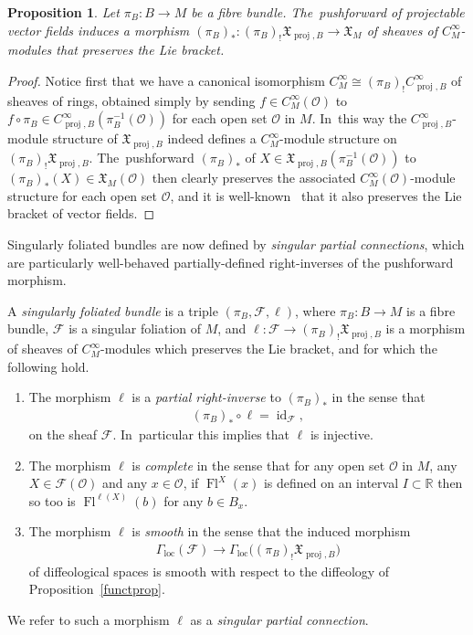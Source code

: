 \documentclass[11pt]{article}
\numberwithin{equation}{section}
\numberwithin{equation}{section}
\newtheorem{Proposition}[Theorem]{Proposition}
\def\loc{\operatorname{loc}}
\def\id{\operatorname{id}}
\def\proj{\operatorname{proj}}
\def\Fl{\operatorname{Fl}}
\def\FF{{\mathcal{F}}}
\def\OO{{\mathcal{O}}}
\def\RB{{\mathbb{R}}}
\def\XF{{\mathfrak{X}}}
\begin{document}
\begin{Proposition}
Let $\pi_{B}\colon B\rightarrow M$ be a fibre bundle. The~pushforward of projectable vector fields induces a morphism $(\pi_{B})_{*}\colon (\pi_{B})_{!}\XF_{\proj,B}\rightarrow\XF_{M}$ of sheaves of $C^{\infty}_{M}$-modules that preserves the Lie bracket.
\end{Proposition}

\begin{proof}
Notice first that we have a canonical isomorphism $C^{\infty}_{M}\cong (\pi_{B})_{!}C^{\infty}_{\proj,B}$ of sheaves of rings, obtained simply by sending $f\in C^{\infty}_{M}(\OO)$ to $f\circ\pi_{B}\in C^{\infty}_{\proj,B}(\pi_{B}^{-1}(\OO))$ for each open set $\OO$ in $M$. In~this way the $C^{\infty}_{\proj,B}$-module structure of $\XF_{\proj,B}$ indeed defines a $C^{\infty}_{M}$-module structure on $(\pi_{B})_{!}\XF_{\proj,B}$. The~pushforward $(\pi_{B})_{*}$ of $X\in\XF_{\proj,B}(\pi_{B}^{-1}(\OO))$ to $(\pi_{B})_{*}(X)\in\XF_{M}(\OO)$ then clearly preserves the associated $C^{\infty}_{M}(\OO)$-module structure for each open set $\OO$, and it is well-known~\cite[Lemma~3.10]{natopdiffgeom} that it also preserves the Lie bracket of vector fields.
\end{proof}

Singularly foliated bundles are now defined by \textit{singular partial connections}, which are particularly well-behaved partially-defined right-inverses of the pushforward morphism.

\begin{Definition}\label{singfolbund}
A \textit{singularly foliated bundle} is a triple $(\pi_{B},\FF,\ell)$, where $\pi_{B}\colon B\rightarrow M$ is a fibre bundle, $\FF$ is a singular foliation of $M$, and $\ell\colon \FF\rightarrow(\pi_{B})_{!}\XF_{\proj,B}$ is a morphism of sheaves of $C^{\infty}_{M}$-modules which preserves the Lie bracket, and for which the following hold.
\begin{enumerate}\itemsep=0pt
\item The morphism $\ell$ is a \textit{partial right-inverse} to $(\pi_{B})_{*}$ in the sense that
\begin{gather*}
(\pi_{B})_{*}\circ\ell = \id_{\FF},
\end{gather*}
on the sheaf $\FF$. In~particular this implies that $\ell$ is injective.
\item The morphism $\ell$ is \textit{complete} in the sense that for any open set $\OO$ in $M$, any $X\in\FF(\OO)$ and any $x\in\OO$, if $\Fl^{X}(x)$ is defined on an interval $I\subset\RB$ then so too is $\Fl^{\ell(X)}(b)$ for any $b\in B_{x}$.
\item The morphism $\ell$ is \textit{smooth} in the sense that the induced morphism
\begin{gather*}
\Gamma_{\loc}(\FF)\rightarrow \Gamma_{\loc}\big((\pi_{B})_{!}\XF_{\proj,B}\big)
\end{gather*}
of diffeological spaces is smooth with respect to the diffeology of Proposition~\ref{functprop}.
\end{enumerate}
We refer to such a morphism $\ell$ as a \textit{singular partial connection}.
\end{Definition}
\end{document}
